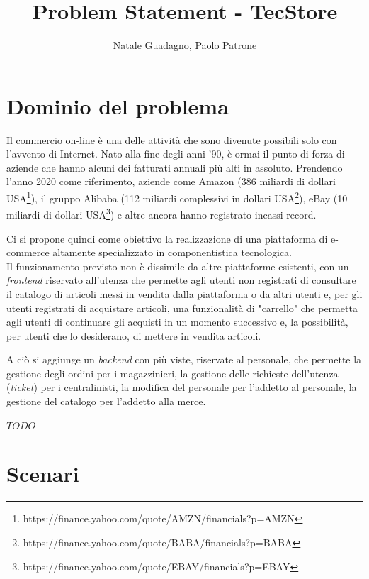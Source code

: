 \documentclass[12pt,a4paper]{article}
\author{Natale Guadagno, Paolo Patrone}
\title{Problem Statement - TecStore}
\begin{document}
\maketitle
\newpage
\tableofcontents
\newpage


\section{Dominio del problema}
Il commercio on-line è una delle attività che sono divenute possibili solo con l'avvento di Internet. Nato alla fine degli anni '90, è ormai il punto di forza di aziende che hanno alcuni dei fatturati annuali più alti in assoluto. Prendendo l'anno 2020 come riferimento, aziende come Amazon (386 miliardi di dollari USA\footnote{https://finance.yahoo.com/quote/AMZN/financials?p=AMZN}), il gruppo Alibaba (112 miliardi complessivi in dollari USA\footnote{https://finance.yahoo.com/quote/BABA/financials?p=BABA}), eBay (10 miliardi di dollari USA\footnote{https://finance.yahoo.com/quote/EBAY/financials?p=EBAY}) e altre ancora hanno registrato incassi record.

Ci si propone quindi come obiettivo la realizzazione di una piattaforma di e-commerce altamente specializzato in componentistica tecnologica. \\

\noindent
Il funzionamento previsto non è dissimile da altre piattaforme esistenti, con un \emph{frontend} riservato all'utenza che permette agli utenti non registrati di consultare il catalogo di articoli messi in vendita dalla piattaforma o da altri utenti e, per gli utenti registrati di acquistare articoli, una funzionalità di "carrello" che permetta agli utenti di continuare gli acquisti in un momento successivo e, la possibilità, per utenti che lo desiderano, di mettere in vendita articoli.

A ciò si aggiunge un \emph{backend} con più viste, riservate al personale, che permette la gestione degli ordini per i magazzinieri, la gestione delle richieste dell'utenza (\emph{ticket}) per i centralinisti, la modifica del personale per l'addetto al personale, la gestione del catalogo per l'addetto alla merce.


$ TODO $


\newpage
\section{Scenari}
\end{document}
